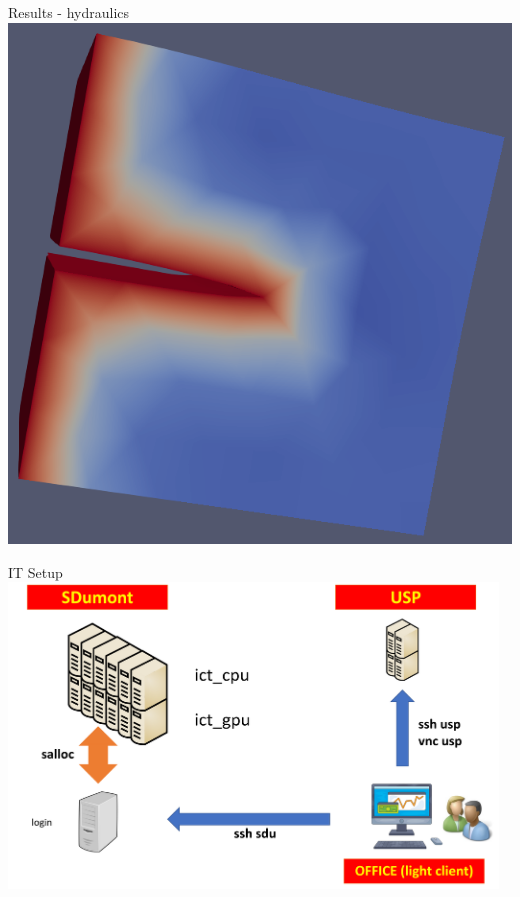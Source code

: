 \begin{frame}[fragile]{Results - hydraulics}
\includegraphics[scale=.5]{png/poromec-fracture-open-flow.png}
\end{frame}

\begin{frame}{IT Setup}
\includegraphics[width=13cm]{png/it_archit}
\end{frame}

